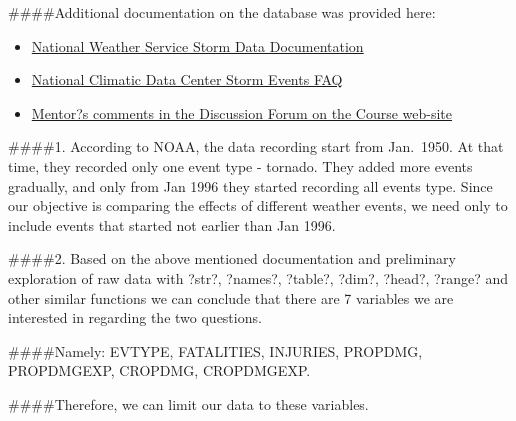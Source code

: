 \documentclass[
]{article}
\newenvironment{Shaded}{\begin{snugshade}}{\end{snugshade}}
\newcommand{\CommentTok}[1]{\textcolor[rgb]{0.56,0.35,0.01}{\textit{#1}}}
\newcommand{\FunctionTok}[1]{\textcolor[rgb]{0.00,0.00,0.00}{#1}}
\newcommand{\NormalTok}[1]{#1}
\newcommand{\OtherTok}[1]{\textcolor[rgb]{0.56,0.35,0.01}{#1}}
\newcommand{\SpecialCharTok}[1]{\textcolor[rgb]{0.00,0.00,0.00}{#1}}
\newcommand{\StringTok}[1]{\textcolor[rgb]{0.31,0.60,0.02}{#1}}
\providecommand{\tightlist}{%
  \setlength{\itemsep}{0pt}\setlength{\parskip}{0pt}}
\begin{document}
\#\#\#\#Additional documentation on the database was provided here:

\begin{itemize}
\tightlist
\item
  \href{https://d396qusza40orc.cloudfront.net/repdata\%2Fpeer2_doc\%2Fpd01016005curr.pdf}{National
  Weather Service Storm Data Documentation}
\item
  \href{https://d396qusza40orc.cloudfront.net/repdata\%2Fpeer2_doc\%2FNCDC\%20Storm\%20Events-FAQ\%20Page.pdf}{National
  Climatic Data Center Storm Events FAQ}
\item
  \href{https://www.coursera.org/learn/reproducible-research/discussions/weeks/4/threads/IdtP_JHzEeaePQ71AQUtYw}{Mentor?s
  comments in the Discussion Forum on the Course web-site}
\end{itemize}

\#\#\#\#1. According to NOAA, the data recording start from Jan.~1950.
At that time, they recorded only one event type - tornado. They added
more events gradually, and only from Jan 1996 they started recording all
events type. Since our objective is comparing the effects of different
weather events, we need only to include events that started not earlier
than Jan 1996.

\begin{Shaded}
\end{Shaded}

\#\#\#\#2. Based on the above mentioned documentation and preliminary
exploration of raw data with ?str?, ?names?, ?table?, ?dim?, ?head?,
?range? and other similar functions we can conclude that there are 7
variables we are interested in regarding the two questions.

\#\#\#\#Namely: EVTYPE, FATALITIES, INJURIES, PROPDMG, PROPDMGEXP,
CROPDMG, CROPDMGEXP.

\#\#\#\#Therefore, we can limit our data to these variables.
\end{document}
